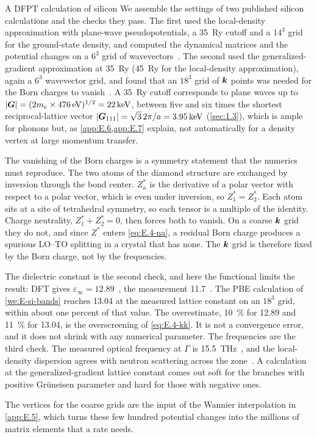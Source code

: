 \begin{workedexample}{A DFPT calculation of silicon}\label{we:E-dfpt-si}
We assemble the settings of two published silicon calculations and the checks they pass. The first used the local-density approximation with plane-wave pseudopotentials, a \SI{35}{Ry} cutoff and a $14^3$ grid for the ground-state density, and computed the dynamical matrices and the potential changes on a $6^3$ grid of wavevectors~\cite{noffsinger2012phonon}. The second used the generalized-gradient approximation at \SI{35}{Ry} (\SI{45}{Ry} for the local-density approximation), again a $6^3$ wavevector grid, and found that an $18^3$ grid of $\bm{k}$ points was needed for the Born charges to vanish~\cite{ponce2018towards}. A \SI{35}{Ry} cutoff corresponds to plane waves up to $|\bm{G}| = (2m_e\times\SI{476}{eV})^{1/2} = \SI{22}{keV}$, between five and six times the shortest reciprocal-lattice vector $|\bm{G}_{111}| = \sqrt3\,2\pi/a = \SI{3.95}{keV}$ (\cref{sec:1.3}), which is ample for phonons but, as \cref{app:E.6,app:E.7} explain, not automatically for a density vertex at large momentum transfer.

The vanishing of the Born charges is a symmetry statement that the numerics must reproduce. The two atoms of the diamond structure are exchanged by inversion through the bond center. $Z^*_\kappa$ is the derivative of a polar vector with respect to a polar vector, which is even under inversion, so $Z^*_1 = Z^*_2$. Each atom sits at a site of tetrahedral symmetry, so each tensor is a multiple of the identity. Charge neutrality, $Z^*_1 + Z^*_2 = 0$, then forces both to vanish. On a coarse $\bm{k}$ grid they do not, and since $Z^*$ enters \cref{eq:E.4-na}, a residual Born charge produces a spurious LO--TO splitting in a crystal that has none. The $\bm{k}$ grid is therefore fixed by the Born charge, not by the frequencies.

The dielectric constant is the second check, and here the functional limits the result: DFT gives $\varepsilon_\infty = 12.89$~\cite{ponce2018towards}, the measurement 11.7~\cite{franta2017temperature}. The PBE calculation of \cref{we:E-si-bands} reaches 13.04 at the measured lattice constant on an $18^3$ grid, within about one percent of that value. The overestimate, \SI{10}{\percent} for 12.89 and \SI{11}{\percent} for 13.04, is the overscreening of \cref{eq:E.4-kk}. It is not a convergence error, and it does not shrink with any numerical parameter. The frequencies are the third check. The measured optical frequency at $\Gamma$ is \SI{15.5}{THz}~\cite{nilsson1972study}, and the local-density dispersion agrees with neutron scattering across the zone~\cite[Sect.~V.A]{baroni2001phonons}. A calculation at the generalized-gradient lattice constant comes out soft for the branches with positive Gr\"uneisen parameter and hard for those with negative ones.
\end{workedexample}

The vertices for the coarse grids are the input of the Wannier interpolation in \cref{app:E.5}, which turns these few hundred potential changes into the millions of matrix elements that a rate needs.
